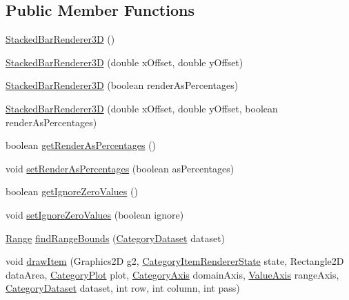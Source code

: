 \subsection*{Public Member Functions}
\begin{DoxyCompactItemize}
\item 
\mbox{\hyperlink{classorg_1_1jfree_1_1chart_1_1renderer_1_1category_1_1_stacked_bar_renderer3_d_a421bdc9cd4f4438c83e7fdca4e159e2e}{Stacked\+Bar\+Renderer3D}} ()
\item 
\mbox{\hyperlink{classorg_1_1jfree_1_1chart_1_1renderer_1_1category_1_1_stacked_bar_renderer3_d_aa29facd6a2f582736060606b77d02449}{Stacked\+Bar\+Renderer3D}} (double x\+Offset, double y\+Offset)
\item 
\mbox{\hyperlink{classorg_1_1jfree_1_1chart_1_1renderer_1_1category_1_1_stacked_bar_renderer3_d_ab8dec1d8593d7db52616504a3f4fcbb3}{Stacked\+Bar\+Renderer3D}} (boolean render\+As\+Percentages)
\item 
\mbox{\hyperlink{classorg_1_1jfree_1_1chart_1_1renderer_1_1category_1_1_stacked_bar_renderer3_d_a8995d29a6e2b8bad26d7a9a6fc583472}{Stacked\+Bar\+Renderer3D}} (double x\+Offset, double y\+Offset, boolean render\+As\+Percentages)
\item 
boolean \mbox{\hyperlink{classorg_1_1jfree_1_1chart_1_1renderer_1_1category_1_1_stacked_bar_renderer3_d_a9ec5adc8ebed0dd4ccba1451ad2059ed}{get\+Render\+As\+Percentages}} ()
\item 
void \mbox{\hyperlink{classorg_1_1jfree_1_1chart_1_1renderer_1_1category_1_1_stacked_bar_renderer3_d_a71a9565354cbe9579e31419d2b94a558}{set\+Render\+As\+Percentages}} (boolean as\+Percentages)
\item 
boolean \mbox{\hyperlink{classorg_1_1jfree_1_1chart_1_1renderer_1_1category_1_1_stacked_bar_renderer3_d_a6f15c826b9c0477fce153c93892c590a}{get\+Ignore\+Zero\+Values}} ()
\item 
void \mbox{\hyperlink{classorg_1_1jfree_1_1chart_1_1renderer_1_1category_1_1_stacked_bar_renderer3_d_af938a4d486b92438a1f2be2430f07a6c}{set\+Ignore\+Zero\+Values}} (boolean ignore)
\item 
\mbox{\hyperlink{classorg_1_1jfree_1_1data_1_1_range}{Range}} \mbox{\hyperlink{classorg_1_1jfree_1_1chart_1_1renderer_1_1category_1_1_stacked_bar_renderer3_d_ad39b42b0bade58899ae7087a7025bc3f}{find\+Range\+Bounds}} (\mbox{\hyperlink{interfaceorg_1_1jfree_1_1data_1_1category_1_1_category_dataset}{Category\+Dataset}} dataset)
\item 
void \mbox{\hyperlink{classorg_1_1jfree_1_1chart_1_1renderer_1_1category_1_1_stacked_bar_renderer3_d_a07a7d44645144aa0e985609cf3c1982a}{draw\+Item}} (Graphics2D g2, \mbox{\hyperlink{classorg_1_1jfree_1_1chart_1_1renderer_1_1category_1_1_category_item_renderer_state}{Category\+Item\+Renderer\+State}} state, Rectangle2D data\+Area, \mbox{\hyperlink{classorg_1_1jfree_1_1chart_1_1plot_1_1_category_plot}{Category\+Plot}} plot, \mbox{\hyperlink{classorg_1_1jfree_1_1chart_1_1axis_1_1_category_axis}{Category\+Axis}} domain\+Axis, \mbox{\hyperlink{classorg_1_1jfree_1_1chart_1_1axis_1_1_value_axis}{Value\+Axis}} range\+Axis, \mbox{\hyperlink{interfaceorg_1_1jfree_1_1data_1_1category_1_1_category_dataset}{Category\+Dataset}} dataset, int row, int column, int pass)

\end{DoxyCompactItemize}
